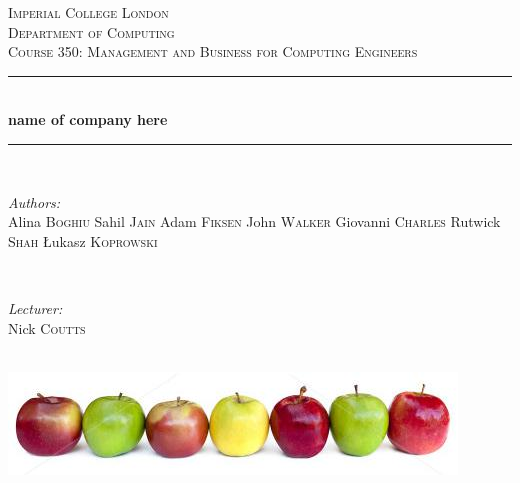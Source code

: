 \documentclass{article}
\begin{document}

\begin{titlepage}
\newcommand{\HRule}{\rule{\linewidth}{0.5mm}}
\center
\textsc{\LARGE Imperial College London}  \\[1.5cm]
\textsc{\Large Department of Computing}  \\[0.5cm]
\textsc{\large Course 350: Management and Business for Computing Engineers} \\[0.5cm]

\HRule \\[0.6cm]
{\huge \bfseries name of company here} \\[0.3cm]
\HRule \\[1.5cm]

\begin{minipage}{0.4\textwidth}

\begin{flushleft} \large \emph{Authors:} \\
Alina  \textsc{Boghiu}
Sahil  \textsc{Jain}
Adam  \textsc{Fiksen}
John  \textsc{Walker}
Giovanni  \textsc{Charles}
Rutwick  \textsc{Shah}
\L ukasz \textsc{Koprowski}
\end{flushleft}

\end{minipage}~
\begin{minipage}{0.4\textwidth}

\begin{flushright} \large \emph{Lecturer:} \\
Nick \textsc{Coutts}
\end{flushright}


\end{minipage}\\[4cm]

\includegraphics[width=\textwidth]{apples.jpg}

\end{titlepage}

\end{document}
